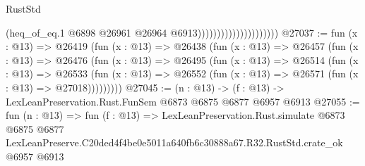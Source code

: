 \begin{lexlean}{RustStd}
\begin{coremodule}
                                            (heq_of_eq.{1}
                                              @6898
                                              @26961
                                              @26964
                                              @6913)))))))))))))))))))))
@27037 := fun (x : @13) =>
  @26419
    (fun (x : @13) =>
    @26438
      (fun (x : @13) =>
      @26457
        (fun (x : @13) =>
        @26476
          (fun (x : @13) =>
          @26495
            (fun (x : @13) =>
            @26514
              (fun (x : @13) =>
              @26533
                (fun (x : @13) => @26552 (fun (x : @13) => @26571 (fun (x : @13) => @27018)))))))))
@27045 := (n : @13) -> (f : @13) -> LexLeanPreservation.Rust.FunSem @6873 @6875 @6877 @6957 @6913
@27055 := fun (n : @13) =>
  fun (f : @13) =>
  LexLeanPreservation.Rust.simulate
    @6873
    @6875
    @6877
    LexLeanPreserve.C20ded4f4be0e5011a640fb6c30888a67.R32.RustStd.crate_ok
    @6957
    @6913
\end{coremodule}
\end{lexlean}
